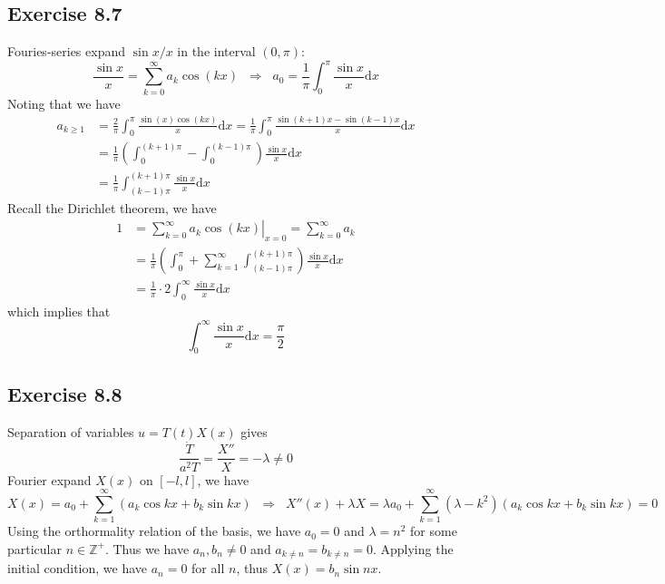 \documentclass[]{ctexart}
\begin{document}
\subsection{Exercise 8.7}
Fouries-series expand $\sin x/x$ in the interval $(0,\pi)$: 
\begin{equation*}
\frac{\sin x}{x}=\sum_{k=0}^\infty a_k\cos(kx)\;\;\Rightarrow\;\;a_0=\frac{1}{\pi}\int_0^\pi\frac{\sin x}{x}\mathrm{d}x
\end{equation*}
Noting that we have 
\begin{align*}
a_{k\ge 1}&=\frac{2}{\pi}\int_0^\pi\frac{\sin(x)\cos(kx)}{x}\mathrm{d}x=\frac{1}{\pi}\int_0^\pi\frac{\sin(k+1)x-\sin(k-1)x}{x}\mathrm{d}x\\
&=\frac{1}{\pi}\left(\int_0^{(k+1)\pi}-\int_0^{(k-1)\pi}\right)\frac{\sin x}{x}\mathrm{d}x\\
&=\frac{1}{\pi}\int_{(k-1)\pi}^{(k+1)\pi}\frac{\sin x}{x}\mathrm{d}x
\end{align*}
Recall the Dirichlet theorem, we have 
\begin{align*}
1&=\left.\sum_{k=0}^\infty a_k\cos(kx)\right|_{x=0}=\sum_{k=0}^\infty a_k\\
&=\frac{1}{\pi}\left(\int_0^\pi+\sum_{k=1}^\infty\int_{(k-1)\pi}^{(k+1)\pi}\right)\frac{\sin x}{x}\mathrm{d}x\\
&=\frac{1}{\pi}\cdot 2\int_0^\infty\frac{\sin x}{x}\mathrm{d}x
\end{align*}
which implies that 
\begin{equation*}
\int_0^\infty\frac{\sin x}{x}\mathrm{d}x=\frac{\pi}{2}
\end{equation*}

\subsection{Exercise 8.8} 
Separation of variables $u=T(t)X(x)$ gives 
\begin{equation*}
\frac{\dot T}{a^2 T}=\frac{X''}{X}=-\lambda\ne 0
\end{equation*}
Fourier expand $X(x)$ on $[-l,l]$, we have 
\begin{equation*}
X(x)=a_0+\sum_{k=1}^\infty(a_k\cos kx+b_k\sin kx)\;\;\Rightarrow\;\;X''(x)+\lambda X=\lambda a_0+\sum_{k=1}^\infty(\lambda-k^2)(a_k\cos kx+b_k\sin kx)=0
\end{equation*}
Using the orthormality relation of the basis, we have $a_0=0$ and $\lambda=n^2$ for some particular $n\in\mathbb Z^+$. Thus we have $a_n,b_n\ne 0$ and $a_{k\ne n}=b_{k\ne n}=0$. 
Applying the initial condition, we have $a_n=0$ for all $n$, thus $X(x)=b_n\sin nx$. 
\end{document}
